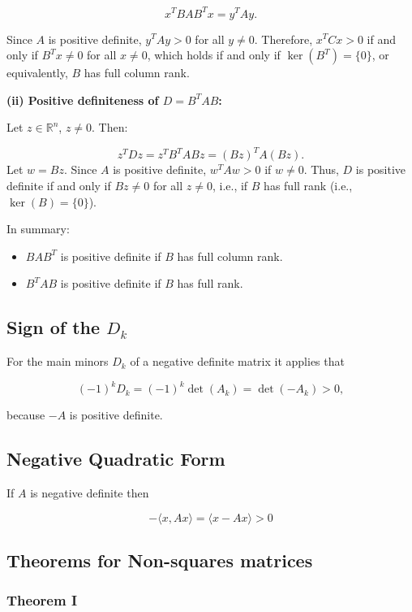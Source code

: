 \[
    x^T BAB^T x = y^T A y.
\]

Since \( A \) is positive definite, \( y^T A y > 0 \) for all \( y \ne 0 \). Therefore, 
\( x^T C x > 0 \) if and only if \( B^T x \ne 0 \) for all \( x \ne 0 \), which holds if and only if 
\( \ker(B^T) = \{0\} \), or equivalently, \( B \) has full column rank.

\textbf{(ii) Positive definiteness of \( D = B^T A B \):}  

Let \( z \in \mathbb{R}^n \), \( z \ne 0 \). Then:

\[
    z^T D z = z^T B^T A B z = (B z)^T A (B z).
\]
Let \( w = B z \). Since \( A \) is positive definite, \( w^T A w > 0 \) if \( w \ne 0 \). Thus, \( D \) is positive definite if and only if \( B z \ne 0 \) for all \( z \ne 0 \), i.e., if \( B \) has full rank (i.e., \( \ker(B) = \{0\} \)).

In summary:

\begin{itemize}
    \item \( BAB^T \) is positive definite if \( B \) has full column rank.
    \item \( B^T A B \) is positive definite if \( B \) has full rank.
\end{itemize}

\QED

\subsection{Sign of the \texorpdfstring{\(D_k\)}{}}

For the main minors \(D_k\) of a negative definite matrix it applies that 

\[
    (-1)^k D_k = (-1)^k \det(A_k) = \det(-A_k) > 0,
\]

because \(-A\) is positive definite.

\subsection{Negative Quadratic Form}

If \(A\) is negative definite then 

\[
    -\langle x, Ax \rangle = \langle x -Ax \rangle > 0
\]

\subsection{Theorems for Non-squares matrices}

\subsubsection{Theorem I}

